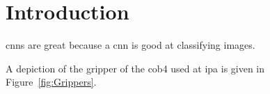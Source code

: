 \chapter{Introduction}
\label{chp:introduction}
\Acp{cnn} are great \cite{goodfellow_deep_2016} because a \ac{cnn} is good at classifying images.

A depiction of the gripper of the \ac{cob4} used at \ac{ipa} is given in Figure~\ref{fig:Grippers}. %

\par\bigskip  %

